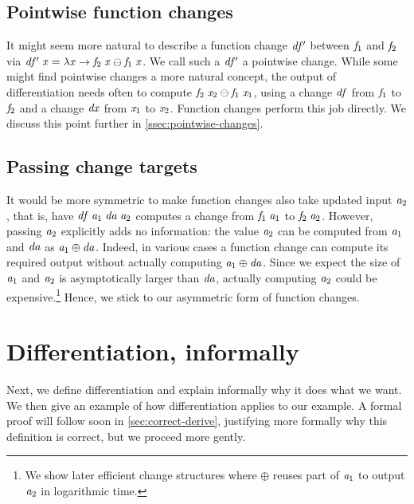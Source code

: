 \subsection{Pointwise function changes}
\label{ssec:pointwise-changes-intro}
It might seem more natural to describe a function change \ensuremath{\Varid{df'}} between \ensuremath{\Varid{f}_{1}} and
\ensuremath{\Varid{f}_{2}} via \ensuremath{\Varid{df'}\;\Varid{x}\mathrel{=}\lambda \Varid{x}\to \Varid{f}_{2}\;\Varid{x}\ominus \Varid{f}_{1}\;\Varid{x}}. We call such a \ensuremath{\Varid{df'}} a pointwise
change.
While some might find pointwise changes a more natural concept, the output of
differentiation needs often to compute \ensuremath{\Varid{f}_{2}\;\Varid{x}_{2}\ominus \Varid{f}_{1}\;\Varid{x}_{1}}, using a change
\ensuremath{\Varid{df}} from \ensuremath{\Varid{f}_{1}} to \ensuremath{\Varid{f}_{2}} and a change \ensuremath{\Varid{dx}} from \ensuremath{\Varid{x}_{1}} to \ensuremath{\Varid{x}_{2}}. Function changes
perform this job directly.
We discuss this point further in \cref{ssec:pointwise-changes}.

\subsection{Passing change targets}
It would be more symmetric to make function changes also take
updated input \ensuremath{\Varid{a}_{2}}, that is, have \ensuremath{\Varid{df}\;\Varid{a}_{1}\;\Varid{da}\;\Varid{a}_{2}} computes a change
from \ensuremath{\Varid{f}_{1}\;\Varid{a}_{1}} to \ensuremath{\Varid{f}_{2}\;\Varid{a}_{2}}. However, passing \ensuremath{\Varid{a}_{2}} explicitly adds no
information: the value \ensuremath{\Varid{a}_{2}} can be computed from \ensuremath{\Varid{a}_{1}} and \ensuremath{\Varid{da}} as
\ensuremath{\Varid{a}_{1}\oplus \Varid{da}}. Indeed, in various cases a function change can
compute its required output without actually computing \ensuremath{\Varid{a}_{1}\oplus \Varid{da}}. Since we expect the size of \ensuremath{\Varid{a}_{1}} and \ensuremath{\Varid{a}_{2}}
is asymptotically larger than \ensuremath{\Varid{da}}, actually computing \ensuremath{\Varid{a}_{2}} could
be expensive.\footnote{We show later efficient change structures where \ensuremath{\oplus }
reuses part of \ensuremath{\Varid{a}_{1}} to output \ensuremath{\Varid{a}_{2}} in logarithmic time.}
Hence, we stick to our asymmetric form of function
changes.

\section{Differentiation, informally}
\label{sec:informal-derive}
Next, we define differentiation and explain informally why it
does what we want. We then give an example of how differentiation
applies to our example. A formal proof will follow soon in
\cref{sec:correct-derive}, justifying more formally why this
definition is correct, but we proceed more gently.

